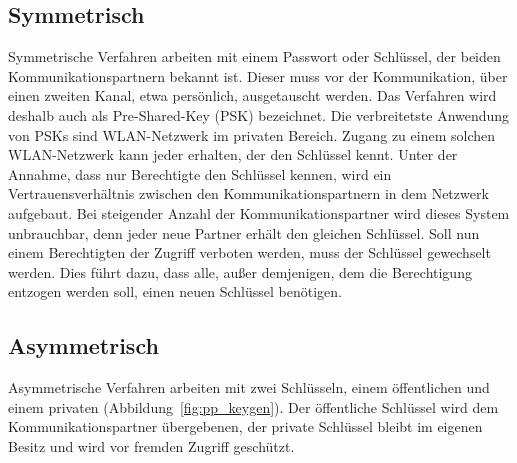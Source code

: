 \documentclass[11pt,a4paper]{report}
\begin{document}
\subsection{Symmetrisch}

Symmetrische Verfahren arbeiten mit einem Passwort oder Schlüssel, der beiden Kommunikationspartnern bekannt ist. Dieser muss vor der Kommunikation, über einen zweiten Kanal, etwa persönlich, ausgetauscht werden. Das Verfahren wird deshalb auch als Pre-Shared-Key (PSK) bezeichnet. Die verbreitetste Anwendung von PSKs sind WLAN-Netzwerk im privaten Bereich. Zugang zu einem solchen WLAN-Netzwerk kann jeder erhalten, der den Schlüssel kennt. Unter der Annahme, dass nur Berechtigte den Schlüssel kennen, wird ein Vertrauensverhältnis zwischen den Kommunikationspartnern in dem Netzwerk aufgebaut. Bei steigender Anzahl der Kommunikationspartner wird dieses System unbrauchbar, denn jeder neue Partner erhält den gleichen Schlüssel. Soll nun einem Berechtigten der Zugriff verboten werden, muss der Schlüssel gewechselt werden. Dies führt dazu, dass alle, außer demjenigen, dem die Berechtigung entzogen werden soll, einen neuen Schlüssel benötigen.

\subsection{Asymmetrisch} \label{sec:auth_asym}

Asymmetrische Verfahren arbeiten mit zwei Schlüsseln, einem öffentlichen und einem privaten (Abbildung~\ref{fig:pp_keygen}). Der öffentliche Schlüssel wird dem Kommunikationspartner übergebenen, der private Schlüssel bleibt im eigenen Besitz und wird vor fremden Zugriff geschützt. 
\end{document}
